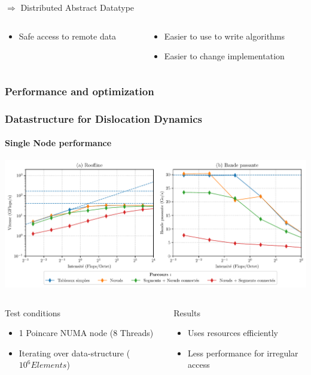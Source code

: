 \documentclass[aspectratio=1610,t,10pt]{beamer}
\begin{document}
\begin{frame}
\begin{block}{$\Rightarrow$ Distributed Abstract Datatype}
\begin{columns}[c]
\begin{column}{.48\textwidth}
\begin{itemize}
				\item Safe access to remote data
			\end{itemize}
		\end{column}
		\begin{column}{.48\textwidth}
			\begin{itemize}
				\item Easier to use to write algorithms
				\item Easier to change implementation
			\end{itemize}
		\end{column}
	\end{columns}
\end{block}
\end{frame}

\subsubsection{Performance and optimization}

\begin{frame}
\frametitle{Datastructure for Dislocation Dynamics}
\framesubtitle{Single Node performance}
    \centering   		  		
    \includegraphics[width=\textwidth]{img/bench_mesh_omp}
\begin{columns}[c]
    \begin{column}{.48\textwidth}
       \begin{block}{Test conditions}
           \begin{itemize}
               \item 1 Poincare NUMA node (8 Threads)
               \item Iterating over data-structure ($10^6 Elements$)
           \end{itemize}
       \end{block}
    \end{column}
    \begin{column}{.48\textwidth}
        \begin{block}{Results}
            \begin{itemize}
                \item Uses resources efficiently
                \item Less performance for irregular access
            \end{itemize}
        \end{block}
    \end{column}
\end{columns}
\end{frame}
\end{document}
